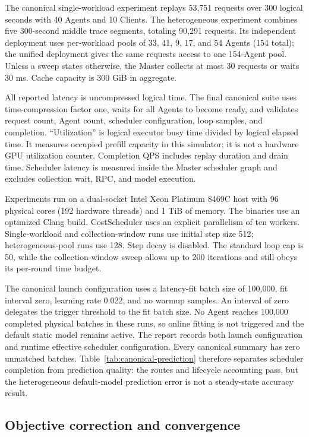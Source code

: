 \documentclass[10pt]{article}
\begin{document}
The canonical single-workload experiment replays 53,751 requests over 300
logical seconds with 40 Agents and 10 Clients. The heterogeneous experiment
combines five 300-second middle trace segments, totaling 90,291 requests. Its
independent deployment uses per-workload pools of 33, 41, 9, 17, and 54 Agents
(154 total); the unified deployment gives the same requests access to one
154-Agent pool. Unless a sweep states otherwise, the Master collects at most
30 requests or waits 30 ms. Cache capacity is 300 GiB in aggregate.

All reported latency is uncompressed logical time. The final canonical suite
uses time-compression factor one, waits for all Agents to become ready, and
validates request count, Agent count, scheduler configuration, loop samples,
and completion. ``Utilization'' is logical executor busy time divided by
logical elapsed time. It measures occupied prefill capacity in this simulator;
it is not a hardware GPU utilization counter. Completion QPS includes replay
duration and drain time. Scheduler latency is measured inside the Master
scheduler graph and excludes collection wait, RPC, and model execution.

Experiments run on a dual-socket Intel Xeon Platinum 8469C host with 96
physical cores (192 hardware threads) and 1 TiB of memory. The binaries use an
optimized Clang build. CostScheduler uses an explicit parallelism of ten
workers. Single-workload and collection-window runs use initial step size 512;
heterogeneous-pool runs use 128. Step decay is disabled. The standard loop cap
is 50, while the collection-window sweep allows up to 200 iterations and still
obeys its per-round time budget.

The canonical launch configuration uses a latency-fit batch size of 100,000,
fit interval zero, learning rate 0.022, and no warmup samples. An interval of
zero delegates the trigger threshold to the fit batch size. No Agent reaches
100,000 completed physical batches in these runs, so online fitting is not
triggered and the default static model remains active. The report records both
launch configuration and runtime effective scheduler configuration. Every
canonical summary has zero unmatched batches. Table~\ref{tab:canonical-prediction}
therefore separates scheduler completion from prediction quality: the routes
and lifecycle accounting pass, but the heterogeneous default-model prediction
error is not a steady-state accuracy result.

\subsection{Objective correction and convergence}
\end{document}
